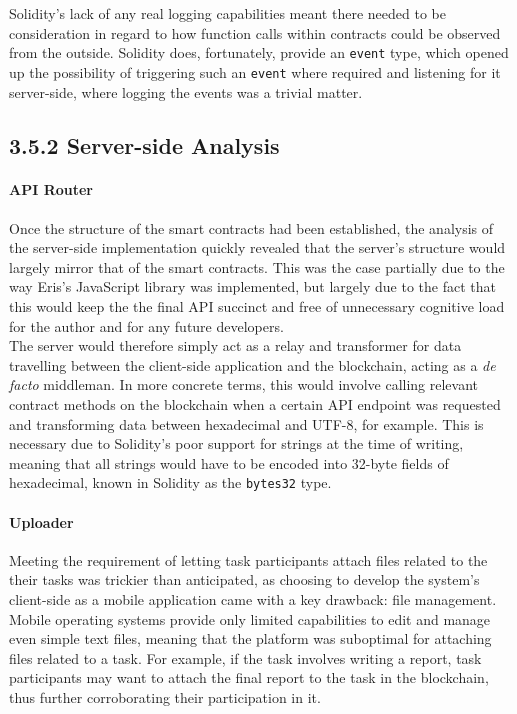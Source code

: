 \documentclass[12pt]{report}
\let\oldparagraph\paragraph
\renewcommand{\paragraph}[1]{\oldparagraph{#1}\mbox{}}
\begin{document}
Solidity's lack of any real logging capabilities meant there needed to
be consideration in regard to how function calls within contracts could
be observed from the outside. Solidity does, fortunately, provide an
\texttt{event} type, which opened up the possibility of triggering such
an \texttt{event} where required and listening for it server-side, where
logging the events was a trivial matter.

\subsection{3.5.2 Server-side Analysis}\label{server-side-analysis}

\paragraph{API Router}\label{api-router}

Once the structure of the smart contracts had been established, the
analysis of the server-side implementation quickly revealed that the
server's structure would largely mirror that of the smart contracts.
This was the case partially due to the way Eris's JavaScript library was
implemented, but largely due to the fact that this would keep the the
final API succinct and free of unnecessary cognitive load for the author
and for any future developers.\\
The server would therefore simply act as a relay and transformer for
data travelling between the client-side application and the blockchain,
acting as a \emph{de facto} middleman. In more concrete terms, this
would involve calling relevant contract methods on the blockchain when a
certain API endpoint was requested and transforming data between
hexadecimal and UTF-8, for example. This is necessary due to Solidity's
poor support for strings at the time of writing, meaning that all
strings would have to be encoded into 32-byte fields of hexadecimal,
known in Solidity as the \texttt{bytes32} type.

\paragraph{Uploader}\label{uploader}

Meeting the requirement of letting task participants attach files
related to the their tasks was trickier than anticipated, as choosing to
develop the system's client-side as a mobile application came with a key
drawback: file management. Mobile operating systems provide only limited
capabilities to edit and manage even simple text files, meaning that the
platform was suboptimal for attaching files related to a task. For
example, if the task involves writing a report, task participants may
want to attach the final report to the task in the blockchain, thus
further corroborating their participation in it.
\end{document}
